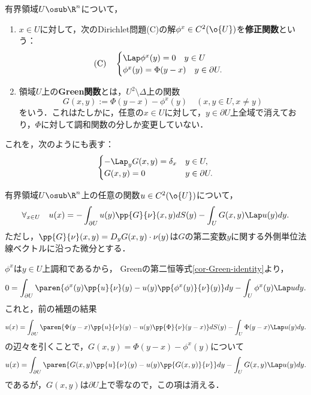 \documentclass[uplatex,dvipdfmx]{jsreport}
\begin{document}
\begin{definition}
    有界領域$U\osub\R^n$について，
    \begin{enumerate}
        \item $x\in U$に対して，次のDirichlet問題(C)の解$\phi^x\in C^2(\o{U})$を\textbf{修正関数}という：
        \[\text{(C)}\quad\begin{cases}
            \Lap\phi^x(y)=0\quad y\in U\\
            \phi^x(y)=\Phi(y-x)\quad y\in\partial U.
        \end{cases}\]
        \item 領域$U$上の\textbf{Green関数}とは，$U^2\setminus\Delta$上の関数
        \[G(x,y):=\Phi(y-x)-\phi^x(y)\quad(x,y\in U,x\ne y)\]
        をいう．これはたしかに，任意の$x\in U$に対して，$y\in\partial U$上全域で消えており，$\Phi$に対して調和関数の分しか変更していない．
    \end{enumerate}
\end{definition}
\begin{remarks}
    これを，次のようにも表す：
    \[\begin{cases}
        -\Lap_y G(x,y)=\delta_x& y\in U,\\
        G(x,y)=0& y\in \partial U.
    \end{cases}\]
\end{remarks}

\begin{lemma}[Green関数による関数の積分表示]\label{lemma-decomposition-of-C2-function-through-Green-function}
    有界領域$U\osub\R^n$上の任意の関数$u\in C^2(\o{U})$について，
    \[\forall_{x\in U}\quad u(x)=-\int_{\partial U}u(y)\pp{G}{\nu}(x,y)dS(y)-\int_UG(x,y)\Lap u(y)dy.\]
    ただし，$\pp{G}{\nu}(x,y)=D_yG(x,y)\cdot\nu(y)$は$G$の第二変数$y$に関する外側単位法線ベクトルに沿った微分とする．
\end{lemma}
\begin{Proof}
    $\phi^x$は$y\in U$上調和であるから，
    Greenの第二恒等式\ref{cor-Green-identity}より，
    \[0=\int_{\partial U}\paren{\phi^x(y)\pp{u}{\nu}(y)-u(y)\pp{\phi^x(y)}{\nu}(y)}dy-\int_U\phi^x(y)\Lap udy.\]
    これと，前の補題の結果
    \[u(x)=\int_{\partial U}\paren{\Phi(y-x)\pp{u}{\nu}(y)-u(y)\pp{\Phi}{\nu}(y-x)}dS(y)-\int_U\Phi(y-x)\Lap u(y)dy.\]
    の辺々を引くことで，$G(x,y)=\Phi(y-x)-\phi^x(y)$について
    \[u(x)=\int_{\partial U}\paren{G(x,y)\pp{u}{\nu}(y)-u(y)\pp{G(x,y)}{\nu}}dy-\int_UG(x,y)\Lap u(y)dy.\]
    であるが，$G(x,y)$は$\partial U$上で零なので，この項は消える．
\end{Proof}
\end{document}
